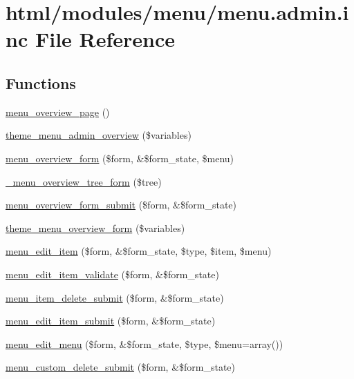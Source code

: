 \hypertarget{menu_8admin_8inc}{
\section{html/modules/menu/menu.admin.inc File Reference}
\label{menu_8admin_8inc}
}
\subsection*{Functions}
\begin{DoxyCompactItemize}
\item 
\hyperlink{menu_8admin_8inc_a2815b30b87a9fb3bbda9cf044a81e25b}{menu\_\-overview\_\-page} ()
\item 
\hyperlink{group__themeable_gaa3f678d076d7ee037013c813d826240c}{theme\_\-menu\_\-admin\_\-overview} (\$variables)
\item 
\hyperlink{menu_8admin_8inc_a460cda2f4e09b8281c8c9e01bf65360b}{menu\_\-overview\_\-form} (\$form, \&\$form\_\-state, \$menu)
\item 
\hyperlink{menu_8admin_8inc_a15e0c24820f3445628b676e212e5fbcc}{\_\-menu\_\-overview\_\-tree\_\-form} (\$tree)
\item 
\hyperlink{menu_8admin_8inc_aa16576d9e19529ee9f710dc3b5f5b810}{menu\_\-overview\_\-form\_\-submit} (\$form, \&\$form\_\-state)
\item 
\hyperlink{group__themeable_gacdf929f3196f98910f9761b46d672767}{theme\_\-menu\_\-overview\_\-form} (\$variables)
\item 
\hyperlink{menu_8admin_8inc_a02b06886e2d1d1ad4b019f7691b43710}{menu\_\-edit\_\-item} (\$form, \&\$form\_\-state, \$type, \$item, \$menu)
\item 
\hyperlink{menu_8admin_8inc_a9b3b72516acaba98b8be3965616cc735}{menu\_\-edit\_\-item\_\-validate} (\$form, \&\$form\_\-state)
\item 
\hyperlink{menu_8admin_8inc_aa0ab9f4cce0d1ece6c2151ad212e81f9}{menu\_\-item\_\-delete\_\-submit} (\$form, \&\$form\_\-state)
\item 
\hyperlink{menu_8admin_8inc_a78694e41c7d0ed5105c324ca52974cb8}{menu\_\-edit\_\-item\_\-submit} (\$form, \&\$form\_\-state)
\item 
\hyperlink{menu_8admin_8inc_a7b2df6cf690f6d62f9521358229786b3}{menu\_\-edit\_\-menu} (\$form, \&\$form\_\-state, \$type, \$menu=array())
\item 
\hyperlink{menu_8admin_8inc_abe39d1c961ad32624a0c927ecb9ca611}{menu\_\-custom\_\-delete\_\-submit} (\$form, \&\$form\_\-state)

\end{DoxyCompactItemize}
